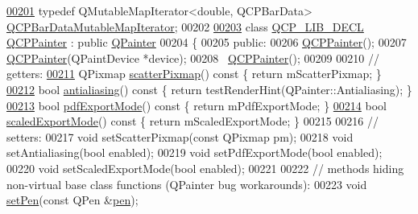 \begin{DoxyCode}
\hypertarget{a00116_source_l00201}{}\hyperlink{a00116_a5f61a38b8bb85ebfefa76ae0983f1c78}{00201} \textcolor{keyword}{typedef} QMutableMapIterator<double, QCPBarData> \hyperlink{a00116_a5f61a38b8bb85ebfefa76ae0983f1c78}{QCPBarDataMutableMapIterator};
00202 
\hypertarget{a00116_source_l00203}{}\hyperlink{a00047}{00203} \textcolor{keyword}{class }\hyperlink{a00116_a5eaab02224a642ded7fb8951e973a02c}{QCP\_LIB\_DECL} \hyperlink{a00047}{QCPPainter} : \textcolor{keyword}{public} \hyperlink{a00060}{QPainter}
00204 \{
00205 \textcolor{keyword}{public}:
00206   \hyperlink{a00047}{QCPPainter}();
00207   \hyperlink{a00047}{QCPPainter}(QPaintDevice *device);
00208   ~\hyperlink{a00047}{QCPPainter}();
00209   
00210   \textcolor{comment}{// getters:}
\hypertarget{a00116_source_l00211}{}\hyperlink{a00047_a4bfe30a2c2391dd9ee387f366f4ee26f}{00211}   QPixmap \hyperlink{a00047_a4bfe30a2c2391dd9ee387f366f4ee26f}{scatterPixmap}()\textcolor{keyword}{ const }\{ \textcolor{keywordflow}{return} mScatterPixmap; \}
\hypertarget{a00116_source_l00212}{}\hyperlink{a00047_a13370d7996315a7150be2fc868da3d4a}{00212}   \textcolor{keywordtype}{bool} \hyperlink{a00047_a13370d7996315a7150be2fc868da3d4a}{antialiasing}()\textcolor{keyword}{ const }\{ \textcolor{keywordflow}{return} testRenderHint(QPainter::Antialiasing); \}
\hypertarget{a00116_source_l00213}{}\hyperlink{a00047_ac272648ed66f0602f2250de45cbbeb33}{00213}   \textcolor{keywordtype}{bool} \hyperlink{a00047_ac272648ed66f0602f2250de45cbbeb33}{pdfExportMode}()\textcolor{keyword}{ const }\{ \textcolor{keywordflow}{return} mPdfExportMode; \}
\hypertarget{a00116_source_l00214}{}\hyperlink{a00047_ac888ac599da0583b29c8b687ff931530}{00214}   \textcolor{keywordtype}{bool} \hyperlink{a00047_ac888ac599da0583b29c8b687ff931530}{scaledExportMode}()\textcolor{keyword}{ const }\{ \textcolor{keywordflow}{return} mScaledExportMode; \}
00215   
00216   \textcolor{comment}{// setters:}
00217   \textcolor{keywordtype}{void} setScatterPixmap(\textcolor{keyword}{const} QPixmap pm);
00218   \textcolor{keywordtype}{void} setAntialiasing(\textcolor{keywordtype}{bool} enabled);
00219   \textcolor{keywordtype}{void} setPdfExportMode(\textcolor{keywordtype}{bool} enabled);
00220   \textcolor{keywordtype}{void} setScaledExportMode(\textcolor{keywordtype}{bool} enabled);
00221  
00222   \textcolor{comment}{// methods hiding non-virtual base class functions (QPainter bug workarounds):}
00223   \textcolor{keywordtype}{void} \hyperlink{a00116_a499165f4744b6d22da7b24295910fb2c}{setPen}(\textcolor{keyword}{const} QPen &\hyperlink{a00116_a1f13fffa0a0faac34ec342973e613a4a}{pen});

\end{DoxyCode}
